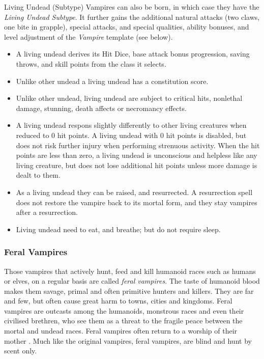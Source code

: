 \begin{35e}{Living Undead (Subtype)}
  Vampires can also be born, in which case they have the \emph{Living Undead
  Subtype}. It further gains the additional natural attacks (two claws, one
  bite in grapple), special attacks, and special qualities, ability bonuses,
  and level adjustment of the \emph{Vampire}  template (see below).

  \begin{itemize}[noitemsep]
    \item{A living undead derives its Hit Dice, base attack bonus progression,
      saving throws, and skill points from the class it selects.
    }
    \item{Unlike other undead a living undead has a constitution score.}
    \item{Unlike other undead, living undead are subject to critical hits,
      nonlethal damage, stunning, death affects or necromancy effects.}
    \item{A living undead respons slightly differently to other living
      creatures when reduced to 0 hit points. A living undead with 0
      hit points is disabled, but does not risk further injury when
      performing strenuous activity. When the hit points are less than
      zero, a living undead is unconscious and helpless like any living
      creature, but does not lose additional hit points unless more damage
      is dealt to them.
    }
    \item{As a living undead they can be raised, and resurrected. A resurrection
      spell does not restore the vampire back to its mortal form, and they stay
      vampires after a resurrection.
    }
    \item{Living undead need to eat, and breathe; but do not require sleep.}
  \end{itemize}
\end{35e}

\subsubsection{Feral Vampires}
\label{sec:Feral Vampires}

Those vampires that actively hunt, feed and kill humanoid races such as
humans or elves, on a regular basis are called \emph{feral vampires}. The
taste of humanoid blood makes them savage, primal and often primitive hunters
and killers. They are far and few, but often cause great harm to towns, cities
and kingdoms. Feral vampires are outcasts among the humanoids, monstrous races
and even their civilised brethren, who see them as a threat to the fragile
peace between the mortal and undead races. Feral vampires often return to a
worship of their mother . Much like the original vampires,
feral vampires, are blind and hunt by scent only.

